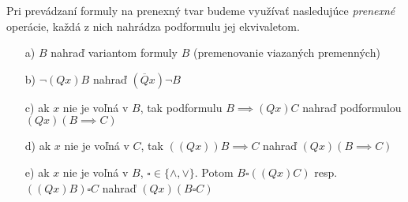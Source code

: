 Pri prevádzaní formuly na prenexný tvar budeme využívať nasledujúce
\emph{prenexné} operácie, každá z nich nahrádza podformulu
jej ekvivaletom.
\begin{itemize}
    \item[a)] $B$ nahraď variantom formuly $B$ (premenovanie viazaných
    premenných)
    \item[b)] $\neg(Q x) B$ nahraď $(\overline{Q} x) \neg B$
    \item[c)] ak $x$ nie je voľná v $B$, tak podformulu $B\implies (Qx)C$
            nahraď podformulou $(Qx) (B\implies C)$
    \item[d)] ak $x$ nie je voľná v $C$, tak $((Qx)) B \implies C$
        nahraď $(Qx) (B \implies C)$
    \item[e)] ak $x$ nie je voľná v $B$, $\square \in \{\land,\lor\}$.
     Potom $B \square ((Qx)C)$ resp. $((Qx)B)\square C$ nahraď
     $(Qx)(B \square C)$
\end{itemize}

